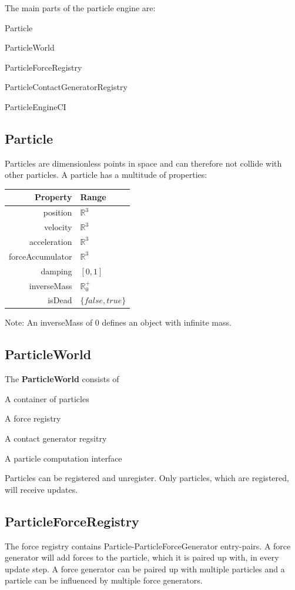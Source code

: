\documentclass[12p, paper=a4, leqno, colorinlistoftodos]{article}
\newenvironment{packed_itemize}
{\begin{itemize}
		\setlength{\itemsep}{0pt}
		\setlength{\parskip}{0pt}
		\setlength{\parsep}{0pt}
	}{\end{itemize}}
\begin{document}
		The main parts of the particle engine are:
		\begin{packed_itemize}
			\item Particle
			\item ParticleWorld
			\item ParticleForceRegistry
			\item ParticleContactGeneratorRegistry
			\item ParticleEngineCI
		\end{packed_itemize}
		
		\subsection{Particle}
		Particles are dimensionless points in space and can therefore not collide with other particles. A particle has a multitude of properties:
		
		\begin{tabular}[H]{r | l}
			Property & Range\\
			\hline
			position & $\mathbb{R}^3$\\
			velocity & $\mathbb{R}^3$\\
			acceleration & $\mathbb{R}^3$\\
			forceAccumulator & $\mathbb{R}^3$\\
			damping & $[0, 1]$\\
			inverseMass & $\mathbb{R}^+_0$\\
			isDead & $\{false, true\}$\\
		\end{tabular}
	
		Note: An inverseMass of 0 defines an object with infinite mass.
		
		\subsection{ParticleWorld}
		The \textbf{ParticleWorld} consists of
		\begin{packed_itemize}
			\item A container of particles
			\item A force registry
			\item A contact generator regsitry
			\item A particle computation interface
		\end{packed_itemize}
		Particles can be registered and unregister. Only particles, which are registered, will receive updates.
		
		\subsection{ParticleForceRegistry}
		The force registry contains Particle-ParticleForceGenerator entry-pairs. A force generator will add forces to the particle, which it is paired up with, in every update step. A force generator can be paired up with multiple particles and a particle can be influenced by multiple force generators.
		
\end{document}
